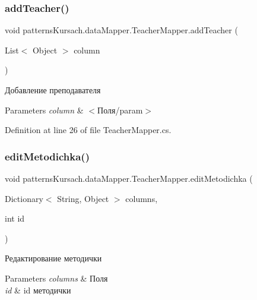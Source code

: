 \subsubsection{\texorpdfstring{add\+Teacher()}{addTeacher()}}
{\footnotesize\ttfamily void patterns\+Kursach.\+data\+Mapper.\+Teacher\+Mapper.\+add\+Teacher (\begin{DoxyParamCaption}\item[{List$<$ Object $>$}]{column }\end{DoxyParamCaption})}



Добавление преподавателя 


\begin{DoxyParams}{Parameters}
{\em column} & $<$Поля/param$>$ \\
\hline
\end{DoxyParams}


Definition at line 26 of file Teacher\+Mapper.\+cs.

\mbox{\label{classpatterns_kursach_1_1data_mapper_1_1_teacher_mapper_abb385030600ac3bbbaf4b2c457203cd4}} 
\subsubsection{\texorpdfstring{edit\+Metodichka()}{editMetodichka()}}
{\footnotesize\ttfamily void patterns\+Kursach.\+data\+Mapper.\+Teacher\+Mapper.\+edit\+Metodichka (\begin{DoxyParamCaption}\item[{Dictionary$<$ String, Object $>$}]{columns,  }\item[{int}]{id }\end{DoxyParamCaption})}



Редактирование методички 


\begin{DoxyParams}{Parameters}
{\em columns} & Поля\\
\hline
{\em id} & id методички\\
\hline
\end{DoxyParams}


